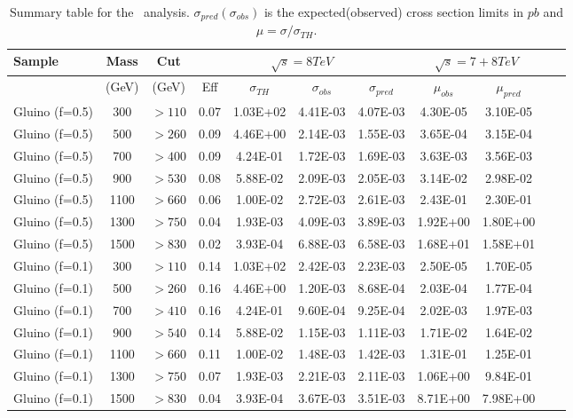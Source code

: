 \begin{table}
 \begin{center}
  \caption{Summary table for the \tktof\ analysis.
    $\sigma_{pred}(\sigma_{obs})$ is the expected(observed)
    cross section limits in $pb$ and $\mu = \sigma/\sigma_{TH}$.}
  \label{tab:SummaryTkTOF}
  \tiny
  \begin{tabular}{|l|c|c|c|c|c|c|c|c|c|c|} \hline
Sample & Mass  & Cut   & \multicolumn{4}{c|}{$\sqrt{s}=8TeV$} & \multicolumn{2}{c|}{$\sqrt{s}=7+8TeV$} \\\hline
       & (GeV) & (GeV) & Eff & $\sigma_{TH}$ & $\sigma_{obs}$ & $\sigma_{pred}$ & $\mu_{obs}$ & $\mu_{pred}$ \\\hline
Gluino (f=0.5)       &  300 & $>110$  &   0.07 & 1.03E+02 & 4.41E-03 & 4.07E-03 & 4.30E-05 & 3.10E-05\\
Gluino (f=0.5)       &  500 & $>260$  &   0.09 & 4.46E+00 & 2.14E-03 & 1.55E-03 & 3.65E-04 & 3.15E-04\\
Gluino (f=0.5)       &  700 & $>400$  &   0.09 & 4.24E-01 & 1.72E-03 & 1.69E-03 & 3.63E-03 & 3.56E-03\\
Gluino (f=0.5)       &  900 & $>530$  &   0.08 & 5.88E-02 & 2.09E-03 & 2.05E-03 & 3.14E-02 & 2.98E-02\\
Gluino (f=0.5)       & 1100 & $>660$  &   0.06 & 1.00E-02 & 2.72E-03 & 2.61E-03 & 2.43E-01 & 2.30E-01\\
Gluino (f=0.5)       & 1300 & $>750$  &   0.04 & 1.93E-03 & 4.09E-03 & 3.89E-03 & 1.92E+00 & 1.80E+00\\
Gluino (f=0.5)       & 1500 & $>830$  &   0.02 & 3.93E-04 & 6.88E-03 & 6.58E-03 & 1.68E+01 & 1.58E+01\\
Gluino (f=0.1)       &  300 & $>110$  &   0.14 & 1.03E+02 & 2.42E-03 & 2.23E-03 & 2.50E-05 & 1.70E-05\\
Gluino (f=0.1)       &  500 & $>260$  &   0.16 & 4.46E+00 & 1.20E-03 & 8.68E-04 & 2.03E-04 & 1.77E-04\\
Gluino (f=0.1)       &  700 & $>410$  &   0.16 & 4.24E-01 & 9.60E-04 & 9.25E-04 & 2.02E-03 & 1.97E-03\\
Gluino (f=0.1)       &  900 & $>540$  &   0.14 & 5.88E-02 & 1.15E-03 & 1.11E-03 & 1.71E-02 & 1.64E-02\\
Gluino (f=0.1)       & 1100 & $>660$  &   0.11 & 1.00E-02 & 1.48E-03 & 1.42E-03 & 1.31E-01 & 1.25E-01\\
Gluino (f=0.1)       & 1300 & $>750$  &   0.07 & 1.93E-03 & 2.21E-03 & 2.11E-03 & 1.06E+00 & 9.84E-01\\
Gluino (f=0.1)       & 1500 & $>830$  &   0.04 & 3.93E-04 & 3.67E-03 & 3.51E-03 & 8.71E+00 & 7.98E+00\\

\end{tabular}
\end{center}
\end{table}
